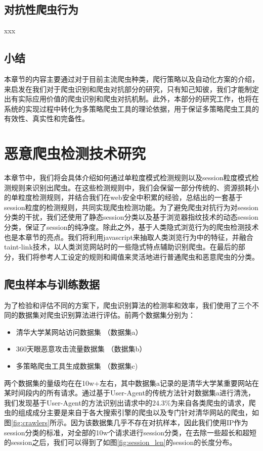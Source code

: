 \documentclass[doctor,privacy,twoside]{buaa_mac}
\begin{document}
\section{对抗性爬虫行为}
xxx

\section{小结}
本章节的内容主要通过对于目前主流爬虫种类，爬行策略以及自动化方案的介绍，来启发在我们对于爬虫识别和爬虫对抗部分的研究，只有知己知彼，我们才能制定出有实际应用价值的爬虫识别和爬虫对抗机制。此外，本部分的研究工作，也将在系统的实现过程中转化为多策略爬虫工具的理论依据，用于保证多策略爬虫工具的有效性、真实性和完备性。

\chapter{恶意爬虫检测技术研究}
本章节中，我们将会具体介绍如何通过单粒度模式检测规则以及session粒度模式检测规则来识别出爬虫。在这些检测规则中，我们会保留一部分传统的、资源损耗小的单粒度检测规则，并结合我们在web安全中积累的经验，总结出的一套基于session粒度的检测规则，共同实现爬虫检测功能。为了避免爬虫对抗行为对session分类的干扰，我们还使用了静态session分类以及基于浏览器指纹技术的动态session分类，保证了session的纯净度。除此之外，基于人类隐式浏览行为的爬虫检测技术也是本章节的亮点。我们将利用javascript来抽取人类浏览行为中的特征，并融合taint-link技术，以人类浏览网站时的一些隐式特点辅助识别爬虫。在最后的部分，我们将参考人工设定的规则和阈值来灵活地进行普通爬虫和恶意爬虫的分类。

\section{爬虫样本与训练数据}
为了检验和评估不同的方案下，爬虫识别算法的检测率和效率，我们使用了三个不同的数据集对爬虫识别算法进行评估。前两个数据集分别为：
\begin{itemize}
\item 清华大学某网站访问数据集 （数据集a）
\item 360天眼恶意攻击流量数据集 （数据集b）
\item 多策略爬虫工具生成数据集 （数据集c)
\end{itemize}

两个数据集的量级均在在10w+左右，其中数据集a记录的是清华大学某重要网站在某时间段内的所有请求。通过基于User-Agent的传统方法针对数据集a进行清洗，我们发现基于User-Agent的方法识别出请求中的24.3\%为来自各类爬虫的请求，爬虫的组成成分主要是来自于各大搜索引擎的爬虫以及专门针对清华网站的爬虫，如图\ref{fig:crawlers}所示。因为该数据集几乎不存在对抗样本，因此我们使用IP作为session分类的标准，对全部的10w个请求进行session分类，在去除一些超长和超短的session之后，我们可以得到了如图\ref{fig:session_len}的session的长度分布。
\end{document}
